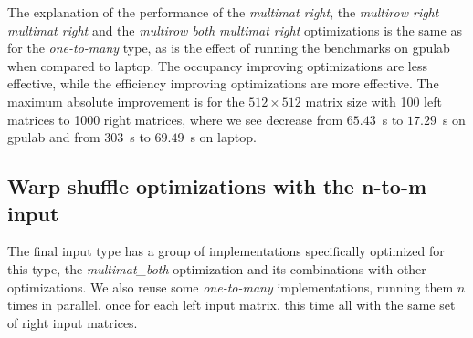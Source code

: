 The explanation of the performance of the \textit{multimat right}, the \textit{multirow right multimat right} and the \textit{multirow both multimat right} optimizations is the same as for the \textit{one-to-many} type, as is the effect of running the benchmarks on gpulab when compared to laptop. The occupancy improving optimizations are less effective, while the efficiency improving optimizations are more effective. %
The maximum absolute improvement is for the $512 \times 512$ matrix size with 100 left matrices to 1000 right matrices, where we see decrease from $65.43$~s to $17.29$~s on gpulab and from $303$~s to $69.49$~s on laptop.


\subsection{Warp shuffle optimizations with the n-to-m input}
The final input type has a group of implementations specifically optimized for this type, the \textit{multimat\_both} optimization and its combinations with other optimizations. We also reuse some \textit{one-to-many} implementations, running them $n$ times in parallel, once for each left input matrix, this time all with the same set of right input matrices.

